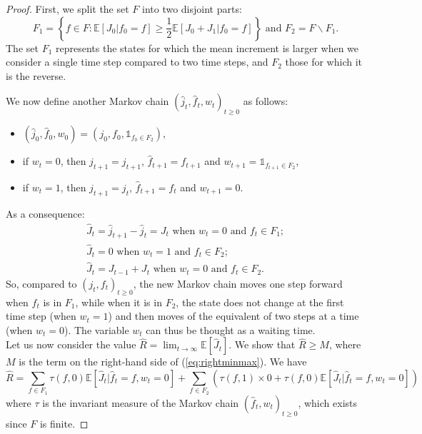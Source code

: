 \documentclass[11pt]{article}
\theoremstyle{plain}
\theoremstyle{definition}
\theoremstyle{remark}
\newcommand{\ind}{\mathbb{1}}
\newcommand{\esp}[1]{\mathbb{E}\left[ #1 \right]}
\begin{document}
\begin{proof}
First, we split the set $F$ into two disjoint parts:
\begin{displaymath}
 F_1 = \left\{f \in F : \esp{J_0 | f_0 = f} \geq \frac{1}{2} \esp{J_0+J_1 | f_0 = f} \right\} \text{ and } F_2 = F \backslash F_1.  
\end{displaymath}
The set $F_1$ represents the states for which the mean increment is larger when we consider a single time step compared to two time steps, and $F_2$ those for which it is the reverse.

We now define another Markov chain $(\hat{j}_t,\hat{f}_t,w_t)_{t\geq0}$ as follows:
\begin{itemize}[label=$\bullet$]
    \item $(\hat{j}_0,\hat{f}_0,w_0) = (j_0,f_0,\ind_{f_0 \in F_2})$,
    \item if $w_t = 0$, then $\hat{j}_{t+1} = j_{t+1}$, $\hat{f}_{t+1} = f_{t+1}$ and $w_{t+1} = \ind_{f_{t+1} \in F_2}$,
    \item if $w_{t} =1$, then  $\hat{j}_{t+1} = j_{t}$, $\hat{f}_{t+1} = f_t$ and $w_{t+1} = 0$.
\end{itemize}

As a consequence:
\begin{align*}
    \hat{J}_t = \hat{j}_{t+1} - \hat{j}_t = J_t \text{ when } w_t=0 \text{ and } f_t\in F_1;\\
    \hat{J}_t = 0 \text{ when } w_t=1 \text{ and } f_t\in F_2;\\
    \hat{J}_t = J_{t-1} + J_t \text{ when } w_t=0 \text{ and } f_t\in F_2.
\end{align*}
So, compared to $(j_t,f_t)_{t\geq 0}$, the new Markov chain moves one step forward when $\hat{f}_t$ is in $F_1$, while when it is in $F_2$, the state does not change at the first time step (when $w_t=1$) and then moves of the equivalent of two steps at a time (when $w_t=0$). The variable $w_t$ can thus be thought as a waiting time. \\

Let us now consider the value $\hat{R} = \lim_{t\to\infty} \esp{\hat{J}_t}$.
We show that $\hat{R}\geq M$, where $M$ is the term on the right-hand side of (\ref{eq:rightminmax}).
We have 
\begin{displaymath}
    \hat{R} = \sum_{f \in F_1} \tau(f,0) \esp{\hat{J}_t | \hat{f}_t = f, w_t=0} + \sum_{f \in F_2}  \left( \tau(f,1) \times 0 + \tau(f,0) \esp{\hat{J}_t | \hat{f}_t = f, w_t=0}\right)
\end{displaymath}
where $\tau$ is the invariant measure of the Markov chain $(\hat{f}_t,w_t)_{t\geq 0}$, which exists since $F$ is finite.


\end{proof}
\end{document}

